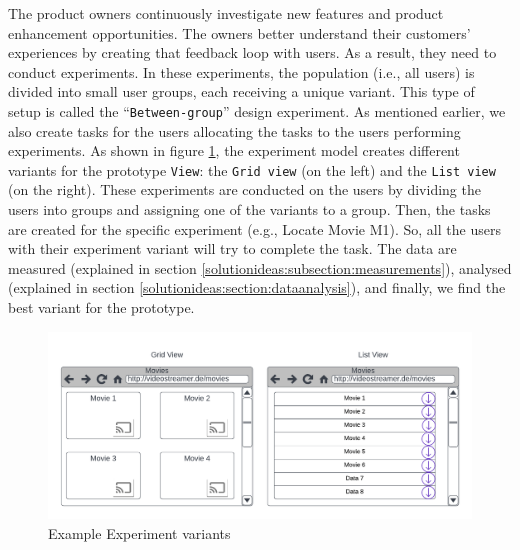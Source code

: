 The product owners continuously investigate new features and product enhancement opportunities. 
The owners better understand their customers' experiences by creating that feedback loop with users. 
As a result, they need to conduct experiments.
In these experiments, the population (i.e., all users) is divided into small user groups, each receiving a unique variant. 
This type of setup is called the ``\texttt{Between-group}'' design experiment. 
As mentioned earlier, we also create tasks for the users allocating the tasks to the users performing experiments.  
As shown in figure \ref{solutionideas:fig:experimentingvariants}, the experiment model creates different variants for the prototype \texttt{View}: the \texttt{Grid view} (on the left) and the \texttt{List view} (on the right). 
These experiments are conducted on the users by dividing the users into groups and assigning one of the variants to a group. 
Then, the tasks are created for the specific experiment (e.g., Locate Movie M1). So, all the users with their experiment variant will try to complete the task.
The data are measured (explained in section \ref{solutionideas:subsection:measurements}), analysed (explained in section \ref{solutionideas:section:dataanalysis}), and finally, we find the best variant for the prototype.

\begin{figure}[ht]
	\centering
  \includegraphics[width=1.0\textwidth]{images/solution-ideas/Experimentvariants.png}
	\caption{Example Experiment variants}
	\label{solutionideas:fig:experimentingvariants}
\end{figure}

